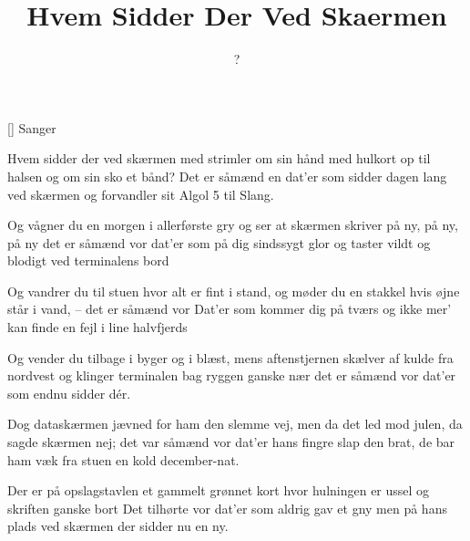 \documentclass[a4paper,11pt]{article}
\title{Hvem Sidder Der Ved Skaermen}
\author{?}
\begin{document}
\maketitle

\begin{roles}
[] Sanger
\end{roles}

\begin{song}
Hvem sidder der ved skærmen
med strimler om sin hånd
med hulkort op til halsen
og om sin sko et bånd?
Det er såmænd en dat'er
som sidder dagen lang
ved skærmen og forvandler
sit Algol 5 til Slang.

Og vågner du en morgen
i allerførste gry
og ser at skærmen skriver
på ny, på ny, på ny
det er såmænd vor dat'er
som på dig sindssygt glor
og taster vildt og blodigt
ved terminalens bord

Og vandrer du til stuen
hvor alt er fint i stand,
og møder du en stakkel
hvis øjne står i vand, --
det er såmænd vor Dat'er
som kommer dig på tværs
og ikke mer' kan finde
en fejl i line halvfjerds

Og vender du tilbage
i byger og i blæst,
mens aftenstjernen skælver
af kulde fra nordvest
og klinger terminalen
bag ryggen ganske nær
det er såmænd vor dat'er
som endnu sidder dér.

Dog dataskærmen jævned
for ham den slemme vej,
men da det led mod julen,
da sagde skærmen nej;
det var såmænd vor dat'er
hans fingre slap den brat,
de bar ham væk fra stuen
en kold december-nat.

Der er på opslagstavlen
et gammelt grønnet kort
hvor hulningen er ussel
og skriften ganske bort
Det tilhørte vor dat'er
som aldrig gav et gny
men på hans plads ved skærmen
der sidder nu en ny.
\end{song}
\end{document}
